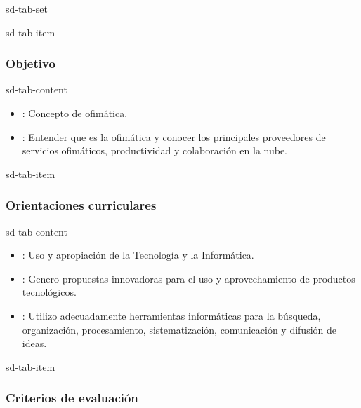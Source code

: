 \documentclass[letterpaper,10pt,spanish]{sphinxmanual}
\begin{document}
\begin{sphinxuseclass}{sd-tab-set}
\begin{sphinxuseclass}{sd-tab-item}\subsubsection*{Objetivo}

\begin{sphinxuseclass}{sd-tab-content}\begin{itemize}
\item {} 
\sphinxAtStartPar
{}: Concepto de ofimática.

\item {} 
\sphinxAtStartPar
{}: Entender que es la ofimática y conocer los principales proveedores de servicios ofimáticos, productividad y colaboración en la nube.

\end{itemize}

\end{sphinxuseclass}
\end{sphinxuseclass}
\begin{sphinxuseclass}{sd-tab-item}\subsubsection*{Orientaciones curriculares}

\begin{sphinxuseclass}{sd-tab-content}\begin{itemize}
\item {} 
\sphinxAtStartPar
{}: Uso y apropiación de la Tecnología y la Informática.

\item {} 
\sphinxAtStartPar
{}: Genero propuestas innovadoras para el uso y aprovechamiento de productos tecnológicos.

\item {} 
\sphinxAtStartPar
{}: Utilizo adecuadamente herramientas informáticas para la búsqueda, organización, procesamiento, sistematización, comunicación y difusión de ideas.

\end{itemize}

\end{sphinxuseclass}
\end{sphinxuseclass}
\begin{sphinxuseclass}{sd-tab-item}\subsubsection*{Criterios de evaluación}


\end{sphinxuseclass}
\end{sphinxuseclass}
\end{document}
